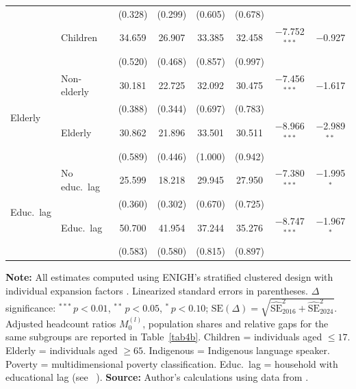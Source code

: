 \documentclass[11pt, a4paper]{article}
\newcommand{\citealp}[1]{\citeauthor{#1}~\citeyear{#1}}
\begin{document}
\begin{table}[htbp]
\begin{tabularx}{\textwidth}{X X cccccc}
 &          & {\footnotesize (0.328)} & {\footnotesize (0.299)} & {\footnotesize (0.605)} & {\footnotesize (0.678)} & & \\
 & Children & 34.659 & 26.907 & 33.385 & 32.458 & $-$7.752$^{***}$ & $-$0.927 \\
 &          & {\footnotesize (0.520)} & {\footnotesize (0.468)} & {\footnotesize (0.857)} & {\footnotesize (0.997)} & & \\[4pt]
\multirow{4}{*}{Elderly}
 & Non-elderly & 30.181 & 22.725 & 32.092 & 30.475 & $-$7.456$^{***}$ & $-$1.617 \\
 &             & {\footnotesize (0.388)} & {\footnotesize (0.344)} & {\footnotesize (0.697)} & {\footnotesize (0.783)} & & \\
 & Elderly     & 30.862 & 21.896 & 33.501 & 30.511 & $-$8.966$^{***}$ & $-$2.989$^{**}$ \\
 &             & {\footnotesize (0.589)} & {\footnotesize (0.446)} & {\footnotesize (1.000)} & {\footnotesize (0.942)} & & \\[4pt]
\multirow{4}{*}{Educ.\ lag}
 & No educ.\ lag & 25.599 & 18.218 & 29.945 & 27.950 & $-$7.380$^{***}$ & $-$1.995$^{*}$ \\
 &               & {\footnotesize (0.360)} & {\footnotesize (0.302)} & {\footnotesize (0.670)} & {\footnotesize (0.725)} & & \\
 & Educ.\ lag    & 50.700 & 41.954 & 37.244 & 35.276 & $-$8.747$^{***}$ & $-$1.967$^{*}$ \\
 &               & {\footnotesize (0.583)} & {\footnotesize (0.580)} & {\footnotesize (0.815)} & {\footnotesize (0.897)} & & \\ \bottomrule
\end{tabularx}
\begin{justify}
\scriptsize
\textbf{Note:} All estimates computed using ENIGH's stratified clustered design with individual expansion factors \parencite{inegi2023}. Linearized standard errors in parentheses. $\Delta$ significance: $^{***}$\,$p<0.01$, $^{**}$\,$p<0.05$, $^{*}$\,$p<0.10$; $\mathrm{SE}(\Delta)=\sqrt{\widehat{\mathrm{SE}}_{2016}^2+\widehat{\mathrm{SE}}_{2024}^2}$. Adjusted headcount ratios $M_0^{(l)}$, population shares and relative gaps for the same subgroups are reported in Table~\ref{tab4b}.
Children = individuals aged $\leq 17$. Elderly = individuals aged $\geq 65$. Indigenous = Indigenous language speaker. Poverty = \textcite{coneval2019} multidimensional poverty classification.
Educ.\ lag = household with educational lag (see \citealp{coneval2019}).
\textbf{Source:} Author's calculations using data from \textcite{enigh2016, enigh2018, enigh2020, enigh2022, enigh2024}.
\end{justify}
\label{tab4}
\end{table}
\end{document}
